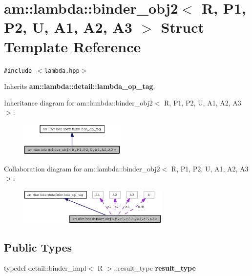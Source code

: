 \section{am::lambda::binder\_\-obj2$<$ R, P1, P2, U, A1, A2, A3 $>$ Struct Template Reference}
\label{structam_1_1lambda_1_1binder__obj2}
{\tt \#include $<$lambda.hpp$>$}

Inherits {\bf am::lambda::detail::lambda\_\-op\_\-tag}.

Inheritance diagram for am::lambda::binder\_\-obj2$<$ R, P1, P2, U, A1, A2, A3 $>$:\begin{figure}[H]
\begin{center}
\leavevmode
\includegraphics[width=149pt]{structam_1_1lambda_1_1binder__obj2__inherit__graph}
\end{center}
\end{figure}
Collaboration diagram for am::lambda::binder\_\-obj2$<$ R, P1, P2, U, A1, A2, A3 $>$:\begin{figure}[H]
\begin{center}
\leavevmode
\includegraphics[width=212pt]{structam_1_1lambda_1_1binder__obj2__coll__graph}
\end{center}
\end{figure}
\subsection*{Public Types}
\begin{CompactItemize}
\item 
typedef detail::binder\_\-impl$<$ R $>$::result\_\-type \textbf{result\_\-type}\label{structam_1_1lambda_1_1binder__obj2_84617801bf8dc830ba9298500150b5b3}

\end{CompactItemize}
